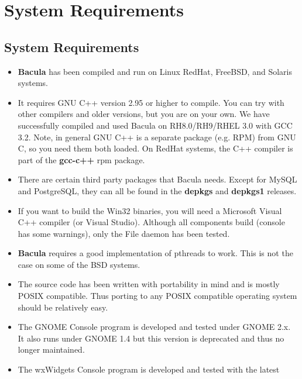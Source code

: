 
\section*{System Requirements}
\label{_ChapterStart51}

\label{SysReqs}

\subsection*{System Requirements}

\begin{itemize}
\item {\bf Bacula} has been compiled and run on Linux RedHat, FreeBSD,  and
   Solaris systems. 
\item It requires GNU C++ version 2.95 or higher to compile. You can try  with
   other compilers and older versions, but you are on your own.  We have
   successfully compiled and used Bacula on RH8.0/RH9/RHEL 3.0  with GCC 3.2.
Note, in general GNU C++ is a separate package (e.g.  RPM) from GNU C, so you
need them both loaded. On RedHat systems,  the C++ compiler is part of the
{\bf gcc-c++} rpm package. 
\item There are certain third party packages that Bacula needs.  Except for
   MySQL and PostgreSQL, they can all be found in the  {\bf depkgs} and {\bf
   depkgs1} releases. 
\item If you want to build the Win32 binaries, you will need a  Microsoft
   Visual C++ compiler (or Visual Studio).  Although all components build
   (console has  some warnings), only the File daemon has been tested. 
\item {\bf Bacula} requires a good implementation of pthreads to work.  This
   is not the case on some of the BSD systems. 
\item The source code has been written with portability in mind and is  mostly
   POSIX compatible. Thus porting to any POSIX compatible  operating system
   should be relatively easy. 
\item The GNOME Console program is developed and tested under GNOME 2.x. It 
   also runs under GNOME 1.4 but this version is deprecated and  thus no longer
   maintained. 
\item The wxWidgets Console program is developed and tested with the latest 

\end{itemize}
